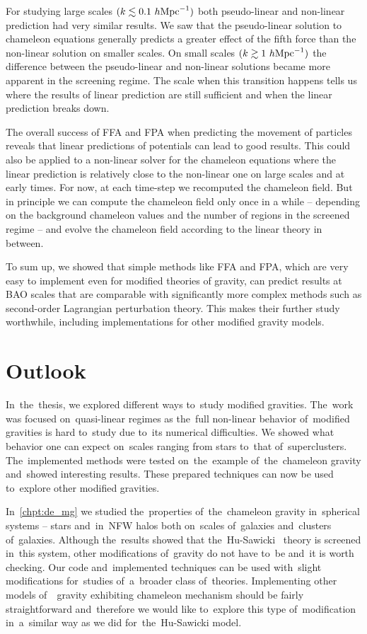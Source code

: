 For studying large scales $(k\lesssim0.1~h\text{Mpc}^{-1})$ both pseudo-linear and non-linear prediction had very similar results. We saw that the pseudo-linear solution to chameleon equations generally predicts a greater effect of the fifth force than the non-linear solution on smaller scales. On small scales $(k\gtrsim1~h\text{Mpc}^{-1})$ the difference between the pseudo-linear and non-linear solutions became more apparent in the screening regime. The scale when this transition happens tells us where the results of linear prediction are still sufficient and when the linear prediction breaks down.

The overall success of FFA and FPA when predicting the movement of particles reveals that linear predictions of potentials can lead to good results. This could also be applied to a non-linear solver for the chameleon equations where the linear prediction is relatively close to the non-linear one on large scales and at early times. For now, at each time-step we recomputed the chameleon field. But in principle we can compute the chameleon field only once in a while -- depending on the background chameleon values and the number of regions in the screened regime -- and evolve the chameleon field according to the linear theory in between.

To sum up, we showed that simple methods like FFA and FPA, which are very easy to implement even for modified theories of gravity, can predict results at BAO scales that are comparable with significantly more complex methods such as second-order Lagrangian perturbation theory. This makes their further study worthwhile, including implementations for other modified gravity models.\clearpage{}
\clearpage{}\chapter{Outlook}
\label{chpt:outlook}
In~the~thesis, we explored different ways to~study modified gravities. The~work was focused on~quasi-linear regimes as the~full non-linear behavior of~modified gravities is hard to~study due to~its numerical difficulties. We showed what behavior one can expect on~scales ranging from stars to~that of~superclusters. The~implemented methods were tested on~the~example of~the~chameleon gravity and~showed interesting results. These prepared techniques can now be used to~explore other modified gravities.

In~\autoref{chpt:de_mg} we studied the~properties of~the~chameleon gravity in~spherical systems -- stars and~in~NFW halos both on~scales of~galaxies and~clusters of~galaxies. Although the~results showed that the~Hu-Sawicki \fR\ theory is screened in~this system, other modifications of~gravity do not have to~be and~it is worth checking. Our code and~implemented techniques can be used with~slight modifications for~studies of~a~broader class of~theories. Implementing other models of~\fR\ gravity exhibiting chameleon mechanism should be fairly straightforward and~therefore we would like to~explore this type of~modification in~a~similar way as we did for~the~Hu-Sawicki model.

